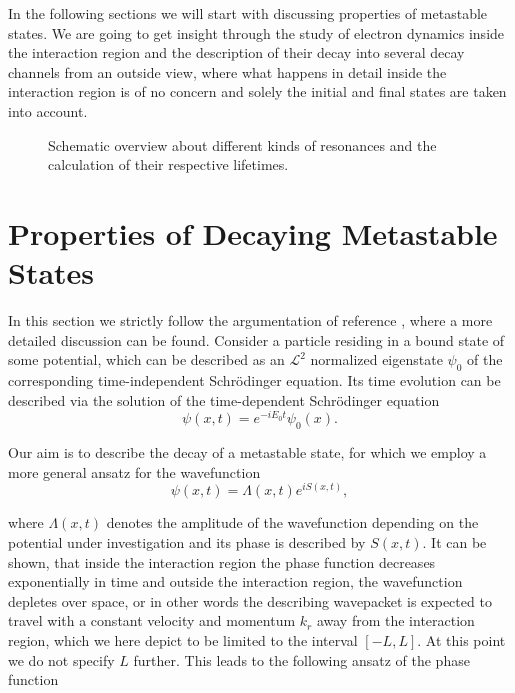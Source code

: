 In the following sections we will start with 
discussing properties of metastable states.
We are going to get insight through the study of electron dynamics inside
the interaction region
and the description of their decay into several decay channels from an outside
view, where what happens in detail inside the interaction region is of no
concern and solely the initial and final states are taken into
account. \cite{Gell-Mann53}


\begin{figure}[h]
  \centering
  
  \caption{Schematic overview about different kinds of resonances and the
           calculation of their respective lifetimes.}
  \label{figure:overview_resonances}
\end{figure}





\section{Properties of Decaying Metastable States}
In this section we strictly follow the argumentation of reference
\cite{Klaiman12}, where a more detailed discussion can be found.
Consider a particle residing in a bound state of some potential, which
can be described as an $\mathcal{L}^2$ normalized eigenstate $\psi_0$
of the corresponding time-independent
Schrödinger equation. Its time evolution can be described via
the solution of the time-dependent Schrödinger equation
\begin{equation}
  \psi(x,t) = e^{-iE_0t} \psi_0(x) .
\end{equation}

Our aim is to describe the decay of a metastable state, for which we employ
a more general ansatz for the wavefunction
\begin{equation}  \label{equation:td_ansatz}
  \psi(x,t) = \Lambda(x,t) e^{iS(x,t)}   ,
\end{equation}

where $\Lambda(x,t)$ denotes the amplitude of the wavefunction
depending on the potential under investigation and
its phase is described by $S(x,t)$. It can be shown, that inside the
interaction region the phase function
decreases exponentially in time and outside the interaction region,
the wavefunction depletes over space, or in other words the
describing wavepacket is expected to travel with a constant velocity and 
momentum $k_r$ away
from the interaction region, which we here depict to be limited to the
interval $[-L,L]$. At this point we do not specify $L$ further.
This leads to the following ansatz of the
phase function

